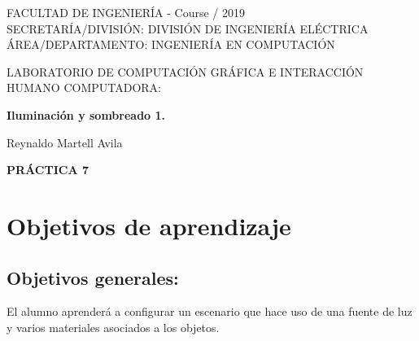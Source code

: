 \documentclass[11pt, english]{article}
\makeatletter
\newcounter{unomenos}
\gdef\@date{ Course \arabic{unomenos}/ 2019}
\makeatother
\begin{document}
\begin{titlepage}
\begin{center}
FACULTAD DE INGENIERÍA - \@date\\
\vspace*{0.15in}
SECRETARÍA/DIVISIÓN: DIVISIÓN DE INGENIERÍA ELÉCTRICA \\
ÁREA/DEPARTAMENTO: INGENIERÍA EN COMPUTACIÓN \\
\vspace*{0.4in}
\begin{large}
LABORATORIO DE COMPUTACIÓN GRÁFICA E INTERACCIÓN HUMANO COMPUTADORA:\\
\end{large}
\vspace*{0.2in}
\begin{Large}
\textbf{Iluminación y sombreado 1.} \\
\end{Large}
\vspace*{0.3in}
\vspace*{0.3in}
\begin{large}
Reynaldo Martell Avila \\
\end{large}
\vspace*{0.5in}
\vspace*{0.5in}
\begin{large}
\textbf{PRÁCTICA 7} \\
\end{large}
\end{center}
\end{titlepage}

\newcommand{\CC}{C\nolinebreak\hspace{-.05em}\raisebox{.4ex}{\tiny\bf +}\nolinebreak\hspace{-.10em}\raisebox{.4ex}{\tiny\bf +}}
\def\CC{{C\nolinebreak[4]\hspace{-.05em}\raisebox{.4ex}{\tiny\bf ++}}}

\tableofcontents

\newpage
\section{Objetivos de aprendizaje}
\subsection{Objetivos generales:}
El alumno aprenderá a configurar un escenario que hace uso de una fuente de luz
y varios materiales asociados a los objetos.
\end{document}

